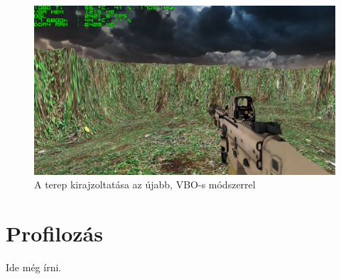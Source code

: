 \begin{figure}[h]
\centering
\includegraphics[scale=0.35]{kepek/vbo_method_fps.png}
\caption{A terep kirajzoltatása az újabb, VBO-s módszerrel}
\label{fig:vbo_fps}
\end{figure}

\section{Profilozás}

Ide még írni.
